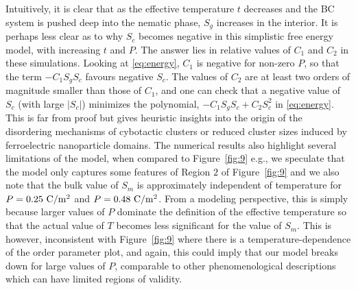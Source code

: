 \documentclass[reprint,amsfonts,amsmath,amssymb,aps,pre,floatfix,10pt]{revtex4-1}
\begin{document}
 Intuitively, it is clear that as the effective temperature $t$ decreases and the BC system is pushed deep into the nematic phase, $S_g$ increases in the interior. It is perhaps less clear as to why $S_c$ becomes negative in this simplistic free energy model, with increasing $t$ and $P$. The answer lies in relative values of $C_1$ and $C_2$ in these simulations. Looking at \eqref{eq:energy}, $C_1$ is negative for non-zero $P$, so that the term $- C_1 S_g S_c$ favours negative $S_c$. The values of $C_2$ are at least two orders of magnitude smaller than those of $C_1$, and one can check that a negative value of $S_c$ (with large $|S_c|$) minimizes the polynomial, $- C_1 S_g S_c + C_2 S_c^2$ in \eqref{eq:energy}. This is far from proof but gives heuristic insights into the origin of the disordering mechanisms of cybotactic clusters or reduced cluster sizes induced by ferroelectric nanoparticle domains. The numerical results also highlight several limitations of the model, when compared to Figure~\ref{fig:9} e.g., we speculate that the model only captures some features of Region $2$ of Figure~\ref{fig:9} and we also note that the bulk value of $S_m$ is approximately independent of temperature for $P = 0.25 ~\rm{C}/\rm{m}^2$ and $P = 0.48 ~\rm{C}/\rm{m}^2$. From a modeling perspective, this is simply because larger values of $P$ dominate the definition of the effective temperature so that the actual value of $T$ becomes less significant for the value of $S_m$. This is however, inconsistent with Figure~\ref{fig:9} where there is a temperature-dependence of the order parameter plot, and again, this could imply that our model breaks down for large values of $P$, comparable to other phenomenological descriptions which can have limited regions of validity.

\end{document}
